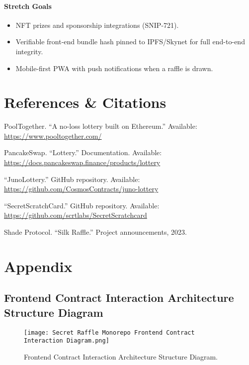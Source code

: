 \documentclass{article}
\begin{document}
\paragraph{Stretch Goals}
\begin{itemize}
  \item NFT prizes and sponsorship integrations (SNIP-721).
  \item Verifiable front-end bundle hash pinned to IPFS/Skynet for full end-to-end integrity.
  \item Mobile-first PWA with push notifications when a raffle is drawn.
\end{itemize}

\section{References \& Citations}
\begin{thebibliography}{9}

PoolTogether. ``A no-loss lottery built on Ethereum.'' Available: \url{https://www.pooltogether.com/}

PancakeSwap. ``Lottery.'' Documentation. Available: \url{https://docs.pancakeswap.finance/products/lottery}

``JunoLottery.'' GitHub repository. Available: \url{https://github.com/CosmosContracts/juno-lottery}

``SecretScratchCard.'' GitHub repository. Available: \url{https://github.com/scrtlabs/SecretScratchcard}

Shade Protocol. ``Silk Raffle.'' Project announcements, 2023.

\end{thebibliography}

\newpage

\section{Appendix}

\subsection{Frontend Contract Interaction Architecture Structure Diagram}
\begin{figure}[h]
  \vspace{-0.5cm}
  \hspace{-2cm}
  \texttt{[image: Secret Raffle Monorepo Frontend Contract Interaction Diagram.png]}
  \caption{Frontend Contract Interaction Architecture Structure Diagram.}
  \label{fig:Frontend Contract Interaction Architecture Structure Diagram Appendix}
\end{figure}
\end{document}
